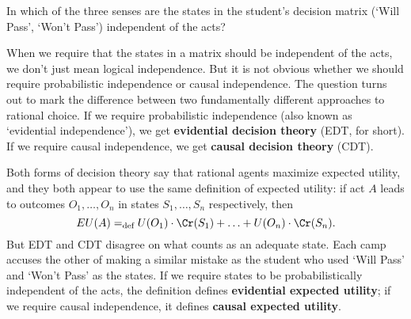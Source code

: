 \begin{exercise}{1}
  In which of the three senses are the states in the student's decision
  matrix (`Will Pass', `Won't Pass') independent of the acts?
\end{exercise}

When we require that the states in a matrix should be independent of the acts,
we don't just mean logical independence. But it is not obvious whether we should
require probabilistic independence or causal independence. The question turns
out to mark the difference between two fundamentally different approaches to
rational choice. If we require probabilistic independence (also known as
`evidential independence'), we get \textbf{evidential decision theory} (EDT, for
short). If we require causal independence, we get \textbf{causal decision
  theory} (CDT).

Both forms of decision theory say that rational agents maximize
expected utility, and they both appear to use the same definition of
expected utility: if act $A$ leads to outcomes $O_1,\ldots,O_n$
in states $S_1,\ldots,S_n$ respectively, then
\[
EU(A) =_\text{def} U(O_1) \cdot \Cr(S_1) + \ldots + U(O_n) \cdot \Cr(S_n).
\]
But EDT and CDT disagree on what counts as an adequate state. Each
camp accuses the other of making a similar mistake as the student who
used `Will Pass' and `Won't Pass' as the states. If we require states
to be probabilistically independent of the acts, the definition
defines \textbf{evidential expected utility}; if we require causal
independence, it defines \textbf{causal expected utility}.


